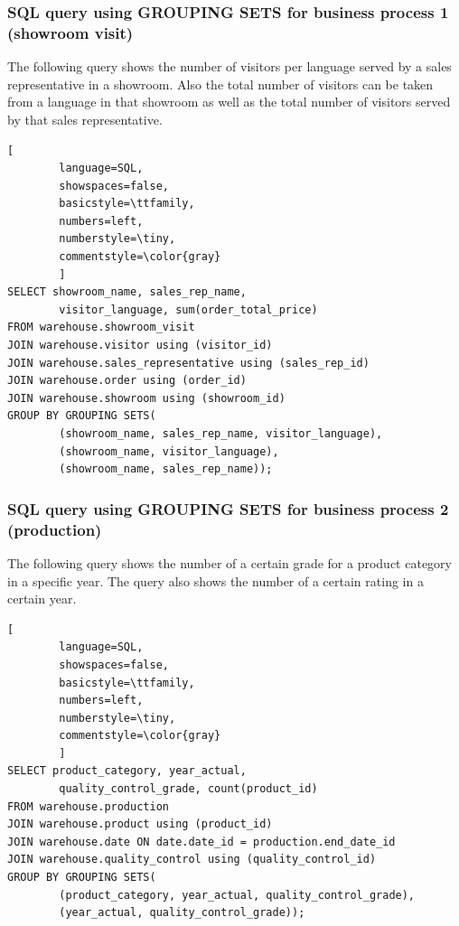 \documentclass[letterpaper,12pt]{article}
\begin{document}
\subsubsection{SQL query using GROUPING SETS for business process 1 (showroom visit)}

The following query shows the number of visitors per language served by a sales representative in a showroom. Also the total number of visitors can be taken from a language in that showroom as well as the total number of visitors served by that sales representative.

\begin{lstlisting}[
        language=SQL,
        showspaces=false,
        basicstyle=\ttfamily,
        numbers=left,
        numberstyle=\tiny,
        commentstyle=\color{gray}
        ]
SELECT showroom_name, sales_rep_name, 
        visitor_language, sum(order_total_price)
FROM warehouse.showroom_visit
JOIN warehouse.visitor using (visitor_id)
JOIN warehouse.sales_representative using (sales_rep_id)
JOIN warehouse.order using (order_id)
JOIN warehouse.showroom using (showroom_id)
GROUP BY GROUPING SETS(
        (showroom_name, sales_rep_name, visitor_language),
        (showroom_name, visitor_language),
        (showroom_name, sales_rep_name));
\end{lstlisting}          

\subsubsection{SQL query using GROUPING SETS for business process 2 (production)}

The following query shows the number of a certain grade for a product category in a specific year. The query also shows the number of a certain rating in a certain year.

\begin{lstlisting}[
        language=SQL,
        showspaces=false,
        basicstyle=\ttfamily,
        numbers=left,
        numberstyle=\tiny,
        commentstyle=\color{gray}
        ]
SELECT product_category, year_actual, 
        quality_control_grade, count(product_id)
FROM warehouse.production
JOIN warehouse.product using (product_id)
JOIN warehouse.date ON date.date_id = production.end_date_id
JOIN warehouse.quality_control using (quality_control_id)
GROUP BY GROUPING SETS(
        (product_category, year_actual, quality_control_grade),
        (year_actual, quality_control_grade));
\end{lstlisting}
\end{document}
